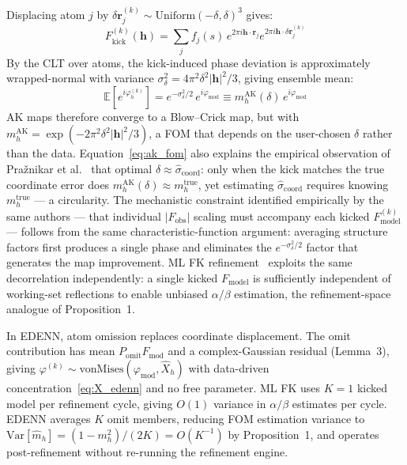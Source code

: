 \documentclass[10pt,twocolumn]{article}
\newcommand{\phimod}{\varphi_{\mathrm{mod}}}
\newcommand{\boldh}{\mathbf{h}}
\newcommand{\boldr}{\mathbf{r}}
\begin{document}
Displacing atom $j$ by
$\delta\mathbf{r}_j^{(k)} \sim \mathrm{Uniform}(-\delta,\delta)^3$
gives:
\begin{equation}
  F_\mathrm{kick}^{(k)}(\boldh)
  = \sum_j f_j(s)\,e^{2\pi i\boldh\cdot\boldr_j}
    e^{2\pi i\boldh\cdot\delta\boldr_j^{(k)}}
  \label{eq:kick_sf}
\end{equation}
By the CLT over atoms, the kick-induced phase deviation is
approximately wrapped-normal with variance
$\sigma^2_\delta = 4\pi^2\delta^2|\boldh|^2/3$,
giving ensemble mean:
\begin{equation}
  \mathbb{E}[e^{i\varphi_h^{(k)}}]
  = e^{-\sigma^2_\delta/2}\,e^{i\phimod}
  \equiv m_h^\mathrm{AK}(\delta)\,e^{i\phimod}
  \label{eq:ak_fom}
\end{equation}
AK maps therefore converge to a Blow--Crick map, but with
$m_h^\mathrm{AK} = \exp(-2\pi^2\delta^2|\boldh|^2/3)$,
a FOM that depends on the user-chosen $\delta$ rather than the data.
Equation~\eqref{eq:ak_fom} also explains the empirical observation
of Pra\v{z}nikar et al.~\cite{praznk2009} that optimal
$\delta \approx \hat\sigma_\mathrm{coord}$: only when the kick
matches the true coordinate error does
$m_h^\mathrm{AK}(\delta) \approx m_h^\mathrm{true}$, yet estimating
$\hat\sigma_\mathrm{coord}$ requires knowing $m_h^\mathrm{true}$ ---
a circularity.
The mechanistic constraint identified empirically by the same
authors --- that individual $|F_\mathrm{obs}|$ scaling must accompany
each kicked $F_\mathrm{model}^{(k)}$ --- follows from the same
characteristic-function argument: averaging structure factors first
produces a single phase and eliminates the $e^{-\sigma^2_\delta/2}$
factor that generates the map improvement.
ML FK refinement~\cite{praznk2014} exploits the same decorrelation
independently: a single kicked $F_\mathrm{model}$ is sufficiently
independent of working-set reflections to enable unbiased
$\alpha/\beta$ estimation, the refinement-space analogue of
Proposition~1.

In EDENN, atom omission replaces coordinate displacement.
The omit contribution has mean $P_\mathrm{omit}F_\mathrm{mod}$
and a complex-Gaussian residual (Lemma~3), giving
$\varphi^{(k)} \sim \mathrm{vonMises}(\phimod, \hat{X}_h)$ with
data-driven concentration~\eqref{eq:X_edenn} and no free parameter.
ML FK uses $K=1$ kicked model per refinement cycle, giving $O(1)$
variance in $\alpha/\beta$ estimates per cycle.
EDENN averages $K$ omit members, reducing FOM estimation variance
to $\mathrm{Var}[\hat m_h] = (1-m_h^2)/(2K) = O(K^{-1})$ by
Proposition~1, and operates post-refinement without re-running the
refinement engine.
\end{document}
